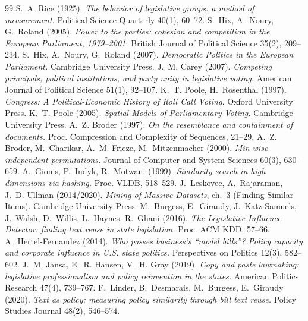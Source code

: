 \documentclass[11pt,a4paper]{article}
\begin{document}
\begin{thebibliography}{99}\small
{} S.~A. Rice (1925). \emph{The behavior of legislative groups: a method of measurement.} Political Science Quarterly 40(1), 60--72.
 S.~Hix, A.~Noury, G.~Roland (2005). \emph{Power to the parties: cohesion and competition in the European Parliament, 1979--2001.} British Journal of Political Science 35(2), 209--234.
 S.~Hix, A.~Noury, G.~Roland (2007). \emph{Democratic Politics in the European Parliament.} Cambridge University Press.
 J.~M. Carey (2007). \emph{Competing principals, political institutions, and party unity in legislative voting.} American Journal of Political Science 51(1), 92--107.
 K.~T. Poole, H.~Rosenthal (1997). \emph{Congress: A Political-Economic History of Roll Call Voting.} Oxford University Press.
 K.~T. Poole (2005). \emph{Spatial Models of Parliamentary Voting.} Cambridge University Press.
 A.~Z. Broder (1997). \emph{On the resemblance and containment of documents.} Proc. Compression and Complexity of Sequences, 21--29.
 A.~Z. Broder, M.~Charikar, A.~M. Frieze, M.~Mitzenmacher (2000). \emph{Min-wise independent permutations.} Journal of Computer and System Sciences 60(3), 630--659.
 A.~Gionis, P.~Indyk, R.~Motwani (1999). \emph{Similarity search in high dimensions via hashing.} Proc. VLDB, 518--529.
 J.~Leskovec, A.~Rajaraman, J.~D. Ullman (2014/2020). \emph{Mining of Massive Datasets}, ch.~3 (Finding Similar Items). Cambridge University Press.
 M.~Burgess, E.~Giraudy, J.~Katz-Samuels, J.~Walsh, D.~Willis, L.~Haynes, R.~Ghani (2016). \emph{The Legislative Influence Detector: finding text reuse in state legislation.} Proc. ACM KDD, 57--66.
 A.~Hertel-Fernandez (2014). \emph{Who passes business's ``model bills''? Policy capacity and corporate influence in U.S. state politics.} Perspectives on Politics 12(3), 582--602.
 J.~M. Jansa, E.~R. Hansen, V.~H. Gray (2019). \emph{Copy and paste lawmaking: legislative professionalism and policy reinvention in the states.} American Politics Research 47(4), 739--767.
 F.~Linder, B.~Desmarais, M.~Burgess, E.~Giraudy (2020). \emph{Text as policy: measuring policy similarity through bill text reuse.} Policy Studies Journal 48(2), 546--574.

\end{thebibliography}
\end{document}
